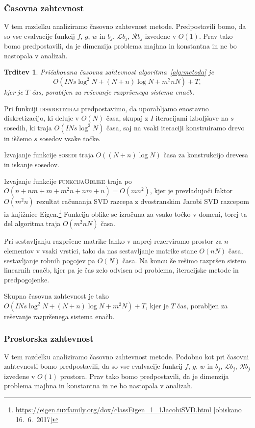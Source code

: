 \documentclass[a4paper,twoside]{article}
\theoremstyle{definition} %
\theoremstyle{plain} %
\newtheorem{trditev}[definicija]{Trditev}
\numberwithin{equation}{section}
\newcommand{\Rc}{\mathcal{R}}
\renewcommand{\L}{\mathcal{L}}
\begin{document}
\subsubsection{Časovna zahtevnost}
V tem razdelku analiziramo časovno zahtevnost metode. Predpostavili bomo, da so
vse evalvacije funkcij $f$, $g$, $w$ in $b_j$, $\L b_j$, $\Rc b_j$ izvedene v $O(1)$.
Prav tako bomo predpostavili, da je dimenzija problema majhna in konstantna in
ne bo nastopala v analizah.

\begin{trditev}
  Pričakovana časovna zahtevnost algoritma~\ref{alg:metoda} je
  \begin{equation}
    O(I N s \log^2 N + (N+n)\log N + m^2n N) + T,
    \label{eq:casovna-zahtevnost}
  \end{equation}
  kjer je $T$ čas, porabljen za reševanje razpršenega sistema enačb.
\end{trditev}
\proof
Pri funkciji \textsc{diskretiziraj} predpostavimo, da uporabljamo enostavno
diskretizacijo, ki deluje v $O(N)$ časa, skupaj z $I$ iteracijami izboljšave
na $s$ sosedih, ki traja $O(I N s \log^2 N)$ časa, saj na vsaki iteraciji
konstruiramo drevo in iščemo $s$ sosedov vsake točke.

Izvajanje funkcije \textsc{sosedi} traja $O((N+n) \log N)$ časa za konstrukcijo
drevesa in iskanje sosedov.

Izvajanje funkcije \textsc{funkcijaOblike} traja po $O(n + nm + m + m^2n + nm +
n) = O(mn^2)$, kjer je prevladujoči faktor $O(m^2 n)$ rezultat računanja SVD
razcepa z dvostranskim Jacobi SVD razcepom iz knjižnice
Eigen.\footnote{\url{https://eigen.tuxfamily.org/dox/classEigen_1_1JacobiSVD.html}
[obiskano 16.\ 6.\ 2017]} Funkcija oblike se izračuna za vsako točko v domeni,
torej ta del algoritma traja $O(m^2 n N)$ časa.

Pri sestavljanju razpršene matrike lahko v naprej rezerviramo prostor za $n$
elementov v vsaki vrstici, tako da nas sestavljanje matrike stane $O(nN)$ časa,
sestavljanje robnih pogojev pa $O(N)$ časa. Na koncu še rešimo razpršen sistem
linearnih enačb, kjer pa je čas zelo odvisen od problema, iteracijske metode in
predpogojenke.

Skupna časovna zahtevnost je tako $O(I N s \log^2 N + (N+n)\log N + m^2 N) + T$,
kjer je $T$ čas, porabljen za reševanje razpršenega sistema enačb.
\endproof

\subsubsection{Prostorska zahtevnost}
V tem razdelku analiziramo časovno zahtevnost metode. Podobno kot pri časovni
zahtevnosti bomo predpostavili, da so
vse evalvacije funkcij $f$, $g$, $w$ in $b_j$, $\L b_j$, $\Rc b_j$ izvedene v
$O(1)$ prostora.
Prav tako bomo predpostavili, da je dimenzija problema majhna in konstantna in
ne bo nastopala v analizah.
\end{document}
